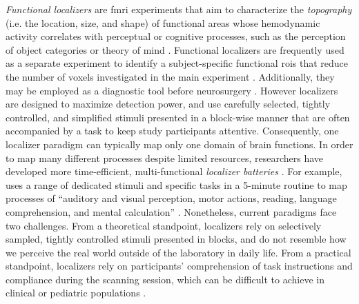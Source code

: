 

\textit{Functional localizers} \citep[s.][for reviews]{saxe2006divide,
friston2006critique} are \ac{fmri} experiments that aim to characterize the
\textit{topography} (i.e. the location, size, and shape) of functional areas
whose hemodynamic activity correlates with perceptual or cognitive processes,
such as the perception of object categories \citep{kanwisher1997ffa} or theory
of mind \citep{spunt2014validating}.
Functional localizers are frequently used as a separate experiment to
identify a subject-specific functional \acp{roi} that reduce the number of
voxels investigated in the main experiment \citep{poldrack2007region,
saxe2006divide}.
Additionally, they may be employed as a diagnostic tool before neurosurgery
\citep[cf.][]{silva2018challenges, szaflarski2017practice}.
However localizers are designed to maximize detection power, and use carefully
selected, tightly controlled, and simplified stimuli presented in a block-wise
manner that are often accompanied by a task to keep study participants
attentive.
Consequently, one localizer paradigm can typically map only one domain of brain
functions.
In order to map many different processes despite limited resources, researchers
have developed more time-efficient, multi-functional \textit{localizer
batteries} \citep[e.g.,][]{barch2013function, drobyshevsky2006rapid,
pinho2018individual, pinho2020individual, pinel2007fast}.
For example, \citet{pinel2007fast} uses a range of dedicated stimuli and
specific tasks in a 5-minute routine to map processes of ``auditory and visual
perception, motor actions, reading, language comprehension, and mental
calculation'' \citep[][p. 15]{pinel2007fast}.
Nonetheless, current paradigms face two challenges.
From a theoretical standpoint, localizers rely on selectively sampled,
tightly controlled stimuli presented in blocks, and do not resemble how we
perceive the real world outside of the laboratory in daily life.
From a practical standpoint, localizers rely on participants' comprehension
of task instructions and compliance during the scanning session, which can be
difficult to achieve in clinical or pediatric populations
\citep{eickhoff2020towards, vanderwal2015inscapes, vanderwal2019movies}.


